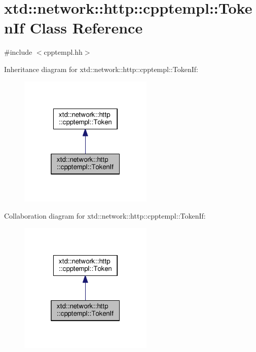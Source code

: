 \hypertarget{classxtd_1_1network_1_1http_1_1cpptempl_1_1TokenIf}{}\section{xtd\+:\+:network\+:\+:http\+:\+:cpptempl\+:\+:Token\+If Class Reference}
\label{classxtd_1_1network_1_1http_1_1cpptempl_1_1TokenIf}


{\ttfamily \#include $<$cpptempl.\+hh$>$}



Inheritance diagram for xtd\+:\+:network\+:\+:http\+:\+:cpptempl\+:\+:Token\+If\+:
\nopagebreak
\begin{figure}[H]
\begin{center}
\leavevmode
\includegraphics[width=181pt]{classxtd_1_1network_1_1http_1_1cpptempl_1_1TokenIf__inherit__graph}
\end{center}
\end{figure}


Collaboration diagram for xtd\+:\+:network\+:\+:http\+:\+:cpptempl\+:\+:Token\+If\+:
\nopagebreak
\begin{figure}[H]
\begin{center}
\leavevmode
\includegraphics[width=181pt]{classxtd_1_1network_1_1http_1_1cpptempl_1_1TokenIf__coll__graph}
\end{center}
\end{figure}
